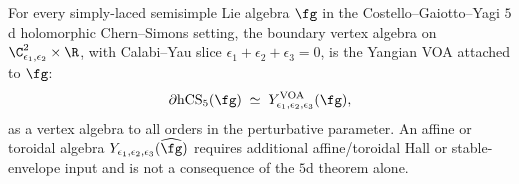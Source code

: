 \begin{theorem}
\label{thm:plat-nonab-compound}
For every simply-laced semisimple Lie algebra \(\fg\) in the
Costello--Gaiotto--Yagi \(5\)d holomorphic Chern--Simons setting, the
boundary vertex algebra on
\(\C^2_{\epsilon_1,\epsilon_2}\times\R\), with Calabi--Yau slice
\(\epsilon_1+\epsilon_2+\epsilon_3=0\), is the Yangian VOA attached to
\(\fg\):
\[
 \partial \hCS_5(\fg)
 \;\simeq\;
 Y^{\mathrm{VOA}}_{\epsilon_1,\epsilon_2,\epsilon_3}(\fg),
\]
as a vertex algebra to all orders in the perturbative parameter.  An
affine or toroidal algebra \(Y_{\epsilon_1,\epsilon_2,\epsilon_3}(\widehat\fg)\)
requires additional affine/toroidal Hall or stable-envelope input and is
not a consequence of the \(5\)d theorem alone.
\end{theorem}

